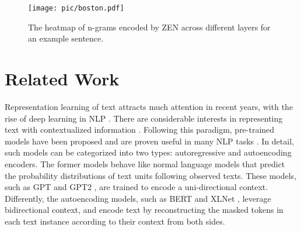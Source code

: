 \documentclass[11pt,a4paper]{article}
\begin{document}
\begin{CJK}{UTF8}{gbsn}
\begin{figure}[t]
	\begin{center}
		\texttt{[image: pic/boston.pdf]}
        \caption{The heatmap of n-grams encoded by ZEN across different layers for an example sentence.}
        \label{fig:visualization-2}
	\end{center}
	\vspace{-1.0em}
\end{figure}


\section{Related Work}

Representation learning of text attracts much attention in recent years, with the rise of deep learning in NLP \citep{collobert2011-JMLR, mikolov2013efficient, pennington2014glove}.
There are considerable interests in representing text with contextualized information \cite{ling2015-NAACL-HLT, melamud-etal-2016-context2vec, bojanowski2017enriching, song-etal-2017-learning, song-etal-2018-directional, peters-etal-2018-deep, ijcai2018-607}.
Following this paradigm,  pre-trained models have been proposed and are proven useful in many NLP tasks \citep{devlin2018bert, radford2018improving, radford2019language, yang2019xlnet}. 
In detail, such models can be categorized into two types: autoregressive and autoencoding encoders.
The former models behave like normal language models that predict the probability distributions of text units following observed texts.
These models, such as 
GPT \citep{radford2018improving} and GPT2 \citep{radford2019language}, are trained to encode a uni-directional context.
Differently, the autoencoding models, such as
BERT \citep{devlin2018bert} and XLNet \citep{yang2019xlnet}, leverage bidirectional context, and encode text by reconstructing the masked tokens in each text instance according to their context from both sides.





\end{CJK}
\end{document}

